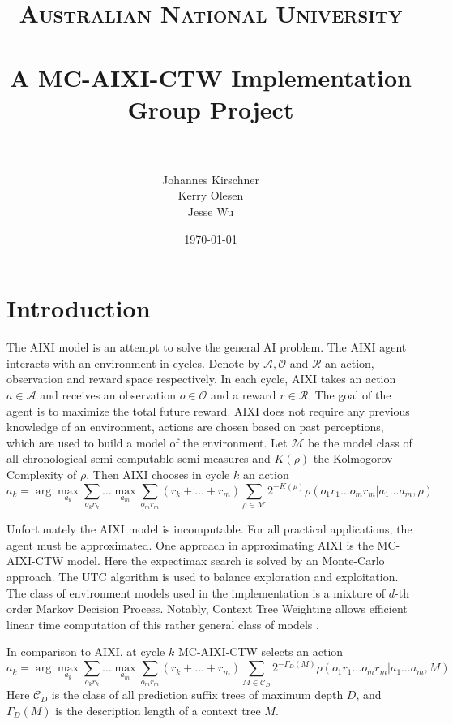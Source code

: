 \documentclass[paper=a4, fontsize=11pt]{scrartcl} %
\title{	
\normalfont \normalsize 
\textsc{Australian National University} \\ [25pt] %
\horrule{0.5pt} \\[0.4cm] %
\huge A MC-AIXI-CTW Implementation\\ Group Project \\ %
\horrule{2pt} \\[0.5cm] %
}
\author{Johannes Kirschner\\ Kerry Olesen\\ Jesse Wu} %
\date{\normalsize\today} %
\numberwithin{equation}{section} %
\numberwithin{figure}{section} %
\numberwithin{table}{section} %
\begin{document}
\maketitle %

\section{Introduction}
The AIXI model \cite{Hutter:04uaibook} is an attempt to solve the general AI problem. The AIXI agent interacts with an environment in cycles. Denote by $\mathcal{A}, \mathcal{O}$ and $\mathcal{R}$ an action, observation and reward space respectively. In each cycle, AIXI takes an action $a \in \mathcal{A}$ and receives an observation $o \in \mathcal{O}$ and a reward $r \in \mathcal{R}$. The goal of the agent is to maximize the total future reward. AIXI does not require any previous knowledge of an environment, actions are chosen based on past perceptions, which are used to build a model of the environment. Let $\mathcal{M}$ be the model class of all chronological semi-computable semi-measures and $K(\rho)$ the Kolmogorov Complexity of $\rho$. Then AIXI chooses in cycle $k$ an action
\[ a_k = \arg \max_{a_k} \sum_{o_kr_k} \dots \max_{a_m} \sum_{o_m r_m} (r_k + \dots + r_m) \sum_{\rho \in \mathcal{M}}2^{-K(\rho)} \rho(o_1r_1\dots o_m r_m|a_1\dots a_m, \rho) \]


\bigskip

Unfortunately the AIXI model is incomputable. For all practical applications, the agent must be approximated. One approach in approximating AIXI is the MC-AIXI-CTW \cite{VNHS09} model. Here the expectimax search is solved by an Monte-Carlo approach. The UTC \cite{UCT} algorithm is used to balance exploration and exploitation. The class of environment models used in the implementation is a mixture of $d$-th order Markov Decision Process. Notably, Context Tree Weighting allows efficient linear time computation of this rather general class of models \cite{CTW}.

\bigskip

In comparison to AIXI, at cycle $k$ MC-AIXI-CTW selects an action
\[ a_k = \arg \max_{a_k} \sum_{o_kr_k} \dots \max_{a_m} \sum_{o_m r_m} (r_k + \dots + r_m) \sum_{M \in \mathcal{C}_D}2^{-\Gamma_D(M)} \rho(o_1r_1\dots o_m r_m|a_1\dots a_m, M) \]
Here $\mathcal{C}_D$ is the class of all prediction suffix trees of maximum depth $D$, and $\Gamma_D(M)$ is the description length of a context tree $M$.

\bigskip
\end{document}
